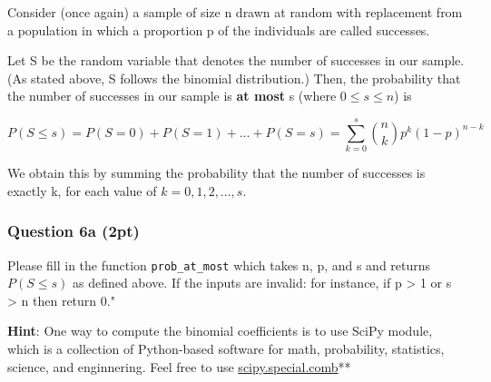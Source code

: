 \documentclass[11pt]{article}
\begin{document}
Consider (once again) a sample of size n drawn at random with
replacement from a population in which a proportion p of the individuals
are called successes.

Let S be the random variable that denotes the number of successes in our
sample. (As stated above, S follows the binomial distribution.) Then,
the probability that the number of successes in our sample is \textbf{at
most} s (where \(0 \leq s \leq n\)) is

\[P(S \leq s) = P(S = 0) + P(S = 1) + ... + P(S = s) = \sum_{k=0}^s \binom{n}{k}p^k(1-p)^{n-k}\]

We obtain this by summing the probability that the number of successes
is exactly k, for each value of \(k = 0, 1, 2, ..., s\).

    \subsubsection{Question 6a (2pt)}\label{question-6a-2pt}

Please fill in the function \texttt{prob\_at\_most} which takes n, p,
and s and returns \(P(S \le s)\) as defined above. If the inputs are
invalid: for instance, if p \textgreater{} 1 or s \textgreater{} n then
return 0."

\textbf{Hint}: One way to compute the binomial coefficients is to use
SciPy module, which is a collection of Python-based software for math,
probability, statistics, science, and enginnering. Feel free to use
\href{https://docs.scipy.org/doc/scipy/reference/generated/scipy.special.comb.html\#scipy.special.comb}{scipy.special.comb}**
\end{document}
